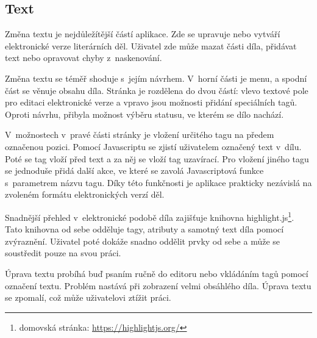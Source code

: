         \subsection{Text}
            Změna textu je nejdůležítější částí aplikace. Zde se upravuje nebo vytváří elektronické verze literárních děl. Uživatel zde může mazat části díla, přidávat text nebo opravovat chyby z~naskenování.
            
            Změna textu se téměř shoduje s~jejím návrhem. V~horní části je menu, a spodní část se věnuje obsahu díla. Stránka je rozdělena do dvou částí: vlevo textové pole pro editaci elektronické verze a vpravo jsou možnosti přidání speciálních tagů. Oproti návrhu, přibyla možnost výběru statusu, ve kterém se dílo nachází.
            
            V~možnostech v~pravé části stránky je vložení určitého tagu na předem označenou pozici. Pomocí Javascriptu se zjistí uživatelem označený text v~dílu. Poté se tag vloží před text a za něj se vloží tag uzavírací. Pro vložení jiného tagu se jednoduše přidá další akce, ve které se zavolá Javascriptová funkce s~parametrem názvu tagu. Díky této funkčnosti je aplikace prakticky nezávislá na zvoleném formátu elektronických verzí děl.
            
            Snadnější přehled v~elektronické podobě díla zajišťuje knihovna highlight.js\footnote{domovská stránka: \url{https://highlightjs.org/}}. Tato knihovna od sebe odděluje tagy, atributy a samotný text díla pomocí zvýraznění. Uživatel poté dokáže snadno oddělit prvky od sebe a může se soustředit pouze na svou práci.
            
            Úprava textu probíhá buď psaním ručně do editoru nebo vkládáním tagů pomocí označení textu. Problém nastává při zobrazení velmi obsáhlého díla. Úprava textu se zpomalí, což může uživatelovi ztížit práci.
